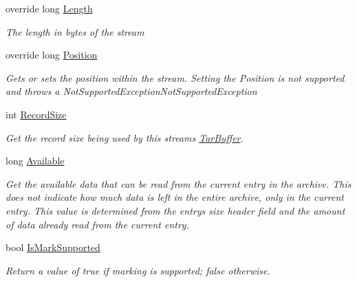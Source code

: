 \begin{DoxyCompactItemize}
override long \hyperlink{class_i_c_sharp_code_1_1_sharp_zip_lib_1_1_tar_1_1_tar_input_stream_a1facbb0c4ec971bb26e8d6fc3037ee22}{Length}
\begin{DoxyCompactList}\small\item\em The length in bytes of the stream \end{DoxyCompactList}\item 
override long \hyperlink{class_i_c_sharp_code_1_1_sharp_zip_lib_1_1_tar_1_1_tar_input_stream_ade825cd1a553ff9600ff06d824add4d2}{Position}
\begin{DoxyCompactList}\small\item\em Gets or sets the position within the stream. Setting the Position is not supported and throws a Not\+Supported\+Exception\+Not\+Supported\+Exception \end{DoxyCompactList}\item 
int \hyperlink{class_i_c_sharp_code_1_1_sharp_zip_lib_1_1_tar_1_1_tar_input_stream_a74f987c8bb8c56f157ee60345a644051}{Record\+Size}
\begin{DoxyCompactList}\small\item\em Get the record size being used by this stream\textquotesingle{}s \hyperlink{class_i_c_sharp_code_1_1_sharp_zip_lib_1_1_tar_1_1_tar_buffer}{Tar\+Buffer}. \end{DoxyCompactList}\item 
long \hyperlink{class_i_c_sharp_code_1_1_sharp_zip_lib_1_1_tar_1_1_tar_input_stream_a5b0ea83b0c6456455c255c165bdef8ef}{Available}
\begin{DoxyCompactList}\small\item\em Get the available data that can be read from the current entry in the archive. This does not indicate how much data is left in the entire archive, only in the current entry. This value is determined from the entry\textquotesingle{}s size header field and the amount of data already read from the current entry. \end{DoxyCompactList}\item 
bool \hyperlink{class_i_c_sharp_code_1_1_sharp_zip_lib_1_1_tar_1_1_tar_input_stream_ab459e5deaf638a070e1fd4a629c8e5fd}{Is\+Mark\+Supported}
\begin{DoxyCompactList}\small\item\em Return a value of true if marking is supported; false otherwise. \end{DoxyCompactList}\end{DoxyCompactItemize}


